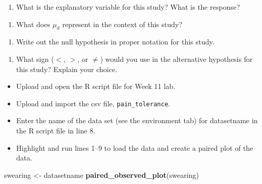 \documentclass[
]{report}
\newenvironment{Shaded}{\begin{snugshade}}{\end{snugshade}}
\newcommand{\FunctionTok}[1]{\textcolor[rgb]{0.13,0.29,0.53}{\textbf{#1}}}
\newcommand{\NormalTok}[1]{#1}
\newcommand{\OtherTok}[1]{\textcolor[rgb]{0.56,0.35,0.01}{#1}}
\providecommand{\tightlist}{%
  \setlength{\itemsep}{0pt}\setlength{\parskip}{0pt}}
\begin{document}
\begin{enumerate}
\def\labelenumi{\arabic{enumi}.}
\tightlist
\item
  What is the explanatory variable for this study? What is the response?
\end{enumerate}

\vspace{0.5in}

\begin{enumerate}
\def\labelenumi{\arabic{enumi}.}
\setcounter{enumi}{1}
\tightlist
\item
  What does \(\mu_d\) represent in the context of this study?
\end{enumerate}

\vspace{0.8in}

\begin{enumerate}
\def\labelenumi{\arabic{enumi}.}
\setcounter{enumi}{2}
\tightlist
\item
  Write out the null hypothesis in proper notation for this study.
\end{enumerate}

\vspace{0.4in}

\begin{enumerate}
\def\labelenumi{\arabic{enumi}.}
\setcounter{enumi}{3}
\tightlist
\item
  What sign (\(<\), \(>\), or \(\neq\)) would you use in the alternative hypothesis for this study? Explain your choice.
\end{enumerate}

\vspace{0.5in}

\begin{itemize}
\item
  Upload and open the R script file for Week 11 lab.
\item
  Upload and import the csv file, \texttt{pain\_tolerance}.
\item
  Enter the name of the data set (see the environment tab) for datasetname in the R script file in line 8.
\item
  Highlight and run lines 1--9 to load the data and create a paired plot of the data.
\end{itemize}

\begin{Shaded}
\begin{Highlighting}[]
\NormalTok{swearing }\OtherTok{\textless{}{-}}\NormalTok{ datasetname}
\FunctionTok{paired\_observed\_plot}\NormalTok{(swearing)}
\end{Highlighting}
\end{Shaded}
\end{document}
